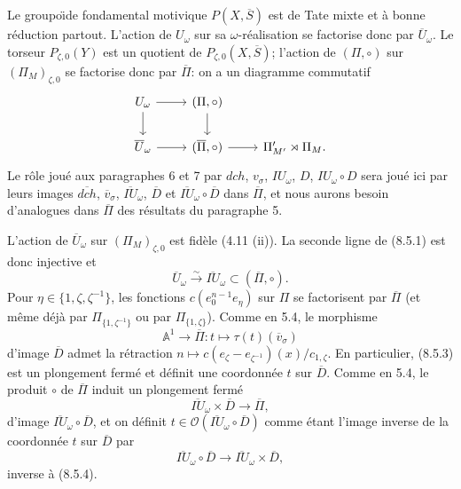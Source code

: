 \documentclass[11pt,a4paper]{article}
\theoremstyle{plain}
\theoremstyle{definition}
\newcommand{\dch}{\mathit{dch}}
\newcommand{\A}{\mathbb{A}}
\begin{document}
\subsection{}
Le groupo\"{\i}de fondamental motivique $P(X, \overline{S})$ est de Tate mixte et \`a bonne r\'eduction partout. L'action de $U_\omega$ sur sa $\omega$-r\'ealisation se factorise donc par $\overline{U}_\omega$. Le torseur $P_{\zeta,0}(Y)$ est un quotient de $P_{\zeta,0}(X, \overline{S})$; l'action de $(\Pi, \circ)$ sur $(\Pi_M)_{\zeta,0}$ se factorise donc par $\overline{\Pi}$: on a un diagramme commutatif
\begin{equation}\label{eq:8.5.1}
\begin{tikzcd}
U_\omega \arrow{r} \arrow{d} & (\Pi, \circ) \arrow{d} \\
\overline{U}_\omega \arrow{r} & (\overline{\Pi}, \circ) \arrow{r} & \Pi'_{M'} \rtimes \Pi_M.
\end{tikzcd}
\end{equation}
Le r\^ole jou\'e aux paragraphes 6 et 7 par $\dch$, $v_\sigma$, $IU_\omega$, $D$, $IU_\omega \circ D$ sera jou\'e ici par leurs images $\overline{\dch}$, $\overline{v}_\sigma$, $\overline{IU}_\omega$, $\overline{D}$ et $\overline{IU}_\omega \circ \overline{D}$ dans $\overline{\Pi}$, et nous aurons besoin d'analogues dans $\overline{\Pi}$ des r\'esultats du paragraphe 5.

L'action de $\overline{U}_\omega$ sur $(\Pi_M)_{\zeta,0}$ est fid\`ele (4.11 (ii)). La seconde ligne de (8.5.1) est donc injective et
\begin{equation}\label{eq:8.5.2}
\overline{U}_\omega \xrightarrow{\sim} \overline{IU}_\omega \subset (\overline{\Pi}, \circ).
\end{equation}
Pour $\eta \in \{1, \zeta, \zeta^{-1}\}$, les fonctions $c(e_0^{n-1}e_\eta)$ sur $\Pi$ se factorisent par $\overline{\Pi}$ (et m\^eme d\'ej\`a par $\Pi_{\{1,\zeta^{-1}\}}$ ou par $\Pi_{\{1,\zeta\}}$). Comme en 5.4, le morphisme
\begin{equation}\label{eq:8.5.3}
\A^1 \to \overline{\Pi}: t \mapsto \tau(t)(\overline{v}_\sigma)
\end{equation}
d'image $\overline{D}$ admet la r\'etraction $n \mapsto c(e_\zeta - e_{\zeta^{-1}})(x)/c_{1,\zeta}$. En particulier, (8.5.3) est un plongement ferm\'e et d\'efinit une coordonn\'ee $t$ sur $\overline{D}$. Comme en 5.4, le produit $\circ$ de $\overline{\Pi}$ induit un plongement ferm\'e
\begin{equation}\label{eq:8.5.4}
\overline{IU}_\omega \times \overline{D} \to \overline{\Pi},
\end{equation}
d'image $\overline{IU}_\omega \circ \overline{D}$, et on d\'efinit $t \in \mathcal{O}(\overline{IU}_\omega \circ \overline{D})$ comme \'etant l'image inverse de la coordonn\'ee $t$ sur $\overline{D}$ par
\begin{equation}\label{eq:8.5.5}
\overline{IU}_\omega \circ \overline{D} \to \overline{IU}_\omega \times \overline{D},
\end{equation}
inverse \`a (8.5.4).
\end{document}
